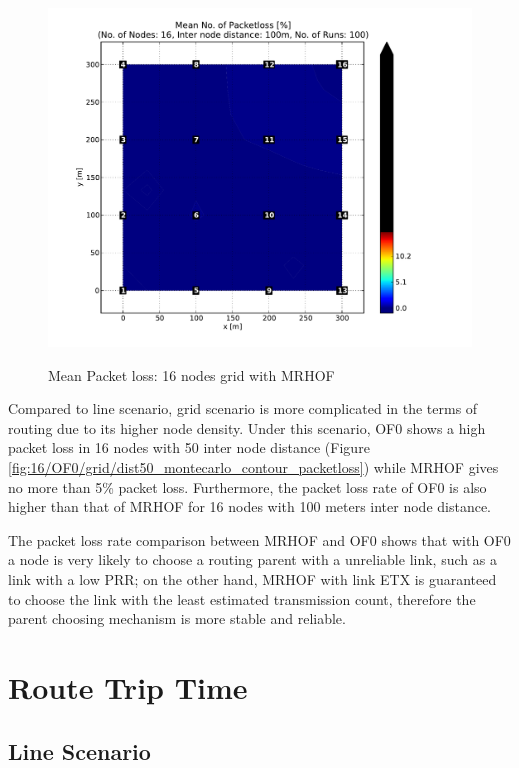 \begin{figure}[htbp]
{      \hspace{-30pt}
      \includegraphics[scale=0.23]{Pics/results/16/MRHOF/grid/dist100_montecarlo_contour_packetloss.pdf}}
  \caption{Mean Packet loss: 16 nodes grid with MRHOF}
 \label{fig:pl_16_grid_mrhof}
\end{figure}

Compared to line scenario, grid scenario is more complicated in the terms of routing due to its higher node density.  Under this scenario, OF0 shows a high packet loss in 16 nodes with 50 inter node distance (Figure \ref{fig:16/OF0/grid/dist50_montecarlo_contour_packetloss}) while MRHOF gives no more than 5\% packet loss. Furthermore, the packet loss rate of OF0 is also higher than that of MRHOF for 16 nodes with 100 meters inter node distance. 
\newline

The packet loss rate comparison between MRHOF and OF0 shows that with OF0 a node is very likely to choose a routing parent with a unreliable link, such as a link with a low PRR; on the other hand, MRHOF with link ETX is guaranteed to choose the link with the least estimated transmission count, therefore the parent choosing mechanism is more stable and reliable. 

\section{Route Trip Time}
\label{rtt}
 
\subsection{Line Scenario}
\label{line scenario}

